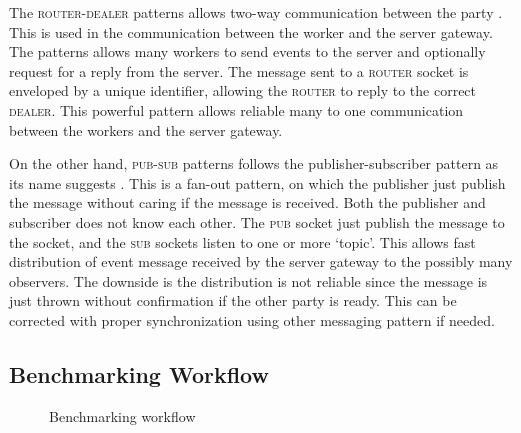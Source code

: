 The \textsc{router-dealer} patterns allows two-way communication between the party \citep{hintjens2013zeromq}.
This is used in the communication between the worker and the server gateway.
The patterns allows many workers to send events to the server and optionally request for a reply from the server.
The message sent to a \textsc{router} socket is enveloped by a unique identifier, allowing the \textsc{router} to reply to the correct \textsc{dealer}.
This powerful pattern allows reliable many to one communication between the workers and the server gateway.

On the other hand, \textsc{pub-sub} patterns follows the publisher-subscriber pattern as its name suggests \citep{hintjens2013zeromq}.
This is a fan-out pattern, on which the publisher just publish the message without caring if the message is received.
Both the publisher and subscriber does not know each other.
The \textsc{pub} socket just publish the message to the socket, and the \textsc{sub} sockets listen to one or more `topic'.
This allows fast distribution of event message received by the server gateway to the possibly many observers.
The downside is the distribution is not reliable since the message is just thrown without confirmation if the other party is ready.
This can be corrected with proper synchronization using other messaging pattern if needed.


\subsection{Benchmarking Workflow}
\begin{figure}
    \centering
    \caption{Benchmarking workflow}
    \label{fig:swimlane}
\end{figure}

